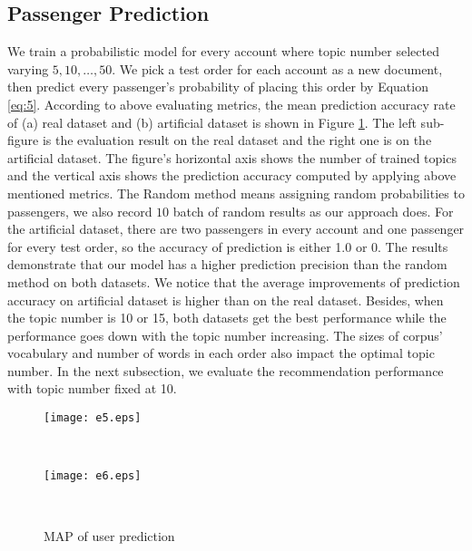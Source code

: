 \documentclass{llncs}
\begin{document}
\subsection{Passenger Prediction}
We train a probabilistic model for every account where topic number selected varying ${5,10,\dots,50}$. We pick a test order for each account as a new document, then predict every passenger's probability of placing this order by Equation \ref{eq:5}. According to above evaluating metrics, the mean prediction accuracy rate of (a) real dataset and (b) artificial dataset is shown in Figure \ref{fig:pred}. The left sub-figure is the evaluation result on the real dataset and the right one is on the artificial dataset. The figure's horizontal axis shows the number of trained topics and the vertical axis shows the prediction accuracy computed by applying above mentioned metrics. The Random method means assigning random probabilities to passengers, we also record $10$ batch of random results as our approach does. For the artificial dataset, there are two passengers in every account and one passenger for every test order, so the accuracy of prediction is either 1.0 or 0. The results demonstrate that our model has a higher prediction precision than the random method on both datasets. We notice that the average improvements of prediction accuracy on artificial dataset is higher than on the real dataset. Besides, when the topic number is 10 or 15, both datasets get the best performance while the performance goes down with the topic number increasing. The sizes of corpus' vocabulary and number of words in each order also impact the optimal topic number. In the next subsection, we evaluate the recommendation performance with topic number fixed at 10.\par 

\begin{figure}[!h]
              \begin{minipage}[t]{0.47\linewidth}
              \centering
              \texttt{[image: e5.eps]}\\
              \end{minipage}
              \begin{minipage}[t]{0.005\linewidth}~~~
              \end{minipage}
              \begin{minipage}[t]{0.47\linewidth}
              \centering
              \texttt{[image: e6.eps]}\\
              \end{minipage}
              \begin{minipage}[t]{0.005\linewidth}~~~
              \end{minipage}
              \caption{MAP of user prediction}
          \label{fig:pred}
\end{figure}
\end{document}
